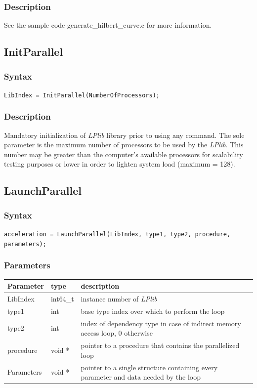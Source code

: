\documentclass[a4paper,12pt]{article}
\begin{document}
\subsubsection*{Description}
See the sample code generate\_hilbert\_curve.c for more information.


\subsection{InitParallel}

\subsubsection*{Syntax}
\tt{LibIndex = InitParallel(NumberOfProcessors);}
\normalfont

\subsubsection*{Description}
Mandatory initialization of \emph{LPlib} library prior to using any command. The sole parameter is the maximum number of processors to be used by the \emph{LPlib}. This number may be greater than the computer's available processors for scalability testing purposes or lower in order to lighten system load (maximum = 128).


\subsection{LaunchParallel}

\subsubsection*{Syntax}
\tt{acceleration = LaunchParallel(LibIndex, type1, type2, procedure, parameters);}
\normalfont

\subsubsection*{Parameters}
\begin{tabular}{|m{2cm}|m{1.5cm}|m{10.5cm}|}
\hline
Parameter  & type    & description \\
\hline
LibIndex   & int64\_t & instance number of \emph{LPlib} \\
\hline
type1      & int     & base type index over which to perform the loop \\
\hline
type2      & int     & index of dependency type in case of indirect memory access loop, 0 otherwise \\
\hline
procedure  & void *  & pointer to a procedure that contains the parallelized loop \\
\hline
Parameters & void *  & pointer to a single structure containing every parameter and data needed by the loop \\
\hline
\end{tabular}
\end{document}
